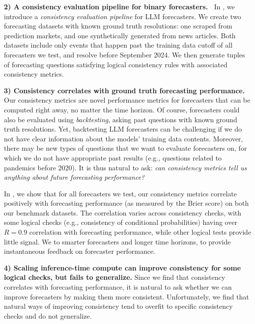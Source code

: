 \textbf{2) A consistency evaluation pipeline for binary forecasters.~}
In , we introduce a \emph{consistency evaluation pipeline} for LLM forecasters.
We create two forecasting datasets with known ground truth resolutions: one scraped from prediction markets, and one synthetically generated from news articles.
Both datasets include only events that happen past the training data cutoff of all forecasters we test, and resolve before September 2024.
We then generate tuples of forecasting questions satisfying logical consistency rules with associated consistency metrics.


\textbf{3) Consistency correlates with ground truth forecasting performance.}
Our consistency metrics are novel performance metrics for forecasters that can be computed right away, no matter the time horizon.
Of course, forecasters could also be evaluated using \emph{backtesting}, asking past questions with known ground truth resolutions.
Yet, backtesting LLM forecasters can be challenging if we do not have clear information about the models' training data contents. Moreover, there may be new types of questions that we want to evaluate forecasters on, for which we do not have appropriate past results (e.g., questions related to pandemics before 2020).
It is thus natural to ask:
\emph{can consistency metrics tell us anything about future forecasting performance?}

In , we show that for all forecasters we test, our consistency metrics correlate positively with forecasting performance (as measured by the Brier score) on both our benchmark datasets.
The correlation varies across consistency checks, with some logical checks (e.g., consistency of conditional probabilities) having over $R=0.9$ correlation with forecasting performance, while other logical tests provide little signal.
We  to smarter forecasters and longer time horizons, to provide instantaneous feedback on forecaster performance.

\textbf{4) Scaling inference-time compute can improve consistency for some logical checks, but fails to generalize.}
Since we find that consistency correlates with forecasting performance, it is natural to ask whether we can improve forecasters by making them more consistent. Unfortunately, we find that natural ways of improving consistency tend to overfit to specific consistency checks and do not generalize.

